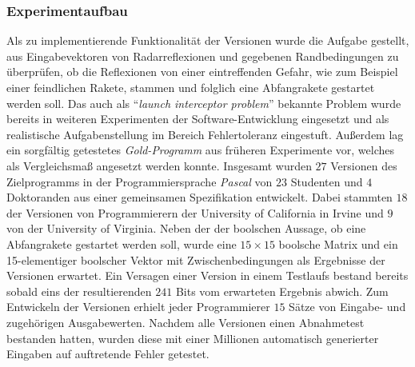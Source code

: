 {\subsubsection{Experimentaufbau}\label{knight-aufbau}
Als zu implementierende Funktionalität der Versionen wurde die Aufgabe gestellt, aus Eingabevektoren von Radarreflexionen und gegebenen Randbedingungen zu überprüfen, ob die Reflexionen von einer eintreffenden Gefahr, wie zum Beispiel einer feindlichen Rakete, stammen und folglich eine Abfangrakete gestartet werden soll. Das auch als \enquote{\emph{launch interceptor problem}} bekannte Problem wurde bereits in weiteren Experimenten der Software-Entwicklung eingesetzt und als realistische Aufgabenstellung im Bereich Fehlertoleranz eingestuft. Außerdem lag ein sorgfältig getestetes \emph{Gold-Programm} aus früheren Experimente vor, welches als Vergleichsmaß angesetzt werden konnte.
Insgesamt wurden $27$ Versionen des Zielprogramms in der Programmiersprache \emph{Pascal} von $23$ Studenten und $4$ Doktoranden aus einer gemeinsamen Spezifikation entwickelt.
Dabei stammten $18$ der Versionen von Programmierern der University of California in Irvine und $9$ von der University of Virginia.
Neben der der boolschen Aussage, ob eine Abfangrakete gestartet werden soll, wurde eine $15 \times 15$ boolsche Matrix und ein 15-elementiger boolscher Vektor mit Zwischenbedingungen als Ergebnisse der Versionen erwartet. Ein Versagen einer Version in einem Testlaufs bestand bereits sobald eins der resultierenden $241$ Bits vom erwarteten Ergebnis abwich. Zum Entwickeln der Versionen erhielt jeder Programmierer $15$ Sätze von Eingabe- und zugehörigen Ausgabewerten.
Nachdem alle Versionen einen Abnahmetest bestanden hatten, wurden diese mit einer Millionen automatisch generierter Eingaben auf auftretende Fehler getestet.
%
}
